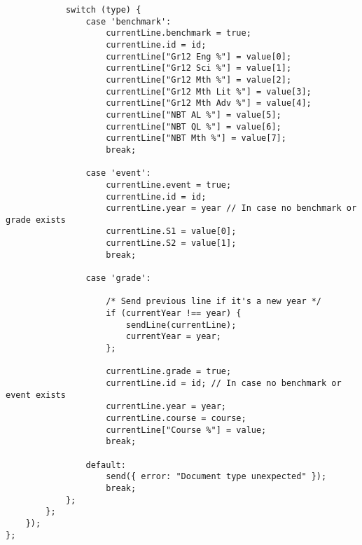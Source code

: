 \begin{verbatim}
            switch (type) {
                case 'benchmark':
                    currentLine.benchmark = true;
                    currentLine.id = id;
                    currentLine["Gr12 Eng %"] = value[0];
                    currentLine["Gr12 Sci %"] = value[1];
                    currentLine["Gr12 Mth %"] = value[2];
                    currentLine["Gr12 Mth Lit %"] = value[3];
                    currentLine["Gr12 Mth Adv %"] = value[4];
                    currentLine["NBT AL %"] = value[5];
                    currentLine["NBT QL %"] = value[6];
                    currentLine["NBT Mth %"] = value[7];
                    break;

                case 'event':
                    currentLine.event = true;
                    currentLine.id = id;
                    currentLine.year = year // In case no benchmark or grade exists
                    currentLine.S1 = value[0];
                    currentLine.S2 = value[1];
                    break;

                case 'grade':

                    /* Send previous line if it's a new year */
                    if (currentYear !== year) {
                        sendLine(currentLine);
                        currentYear = year;
                    };

                    currentLine.grade = true;
                    currentLine.id = id; // In case no benchmark or event exists
                    currentLine.year = year;
                    currentLine.course = course;
                    currentLine["Course %"] = value;
                    break;

                default:
                    send({ error: "Document type unexpected" });
                    break;
            };
        };
    });
};
\end{verbatim}